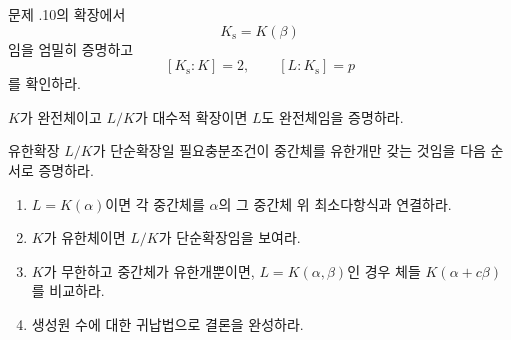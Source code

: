 \begin{exercise}[*]
문제 \thechapter.10의 확장에서
\[
  K_{\mathrm s}=K(\beta)
\]
임을 엄밀히 증명하고
\[
  [K_{\mathrm s}:K]=2,
  \qquad
  [L:K_{\mathrm s}]=p
\]
를 확인하라.
\end{exercise}

\begin{exercise}
$K$가 완전체이고 $L/K$가 대수적 확장이면 $L$도 완전체임을 증명하라.
\end{exercise}

\begin{exercise}[*]
유한확장 $L/K$가 단순확장일 필요충분조건이 중간체를 유한개만 갖는 것임을 다음 순서로 증명하라.
\begin{enumerate}[label=(\alph*)]
  \item $L=K(\alpha)$이면 각 중간체를 $\alpha$의 그 중간체 위 최소다항식과 연결하라.
  \item $K$가 유한체이면 $L/K$가 단순확장임을 보여라.
  \item $K$가 무한하고 중간체가 유한개뿐이면, $L=K(\alpha,\beta)$인 경우 체들 $K(\alpha+c\beta)$를 비교하라.
  \item 생성원 수에 대한 귀납법으로 결론을 완성하라.
\end{enumerate}
\end{exercise}
